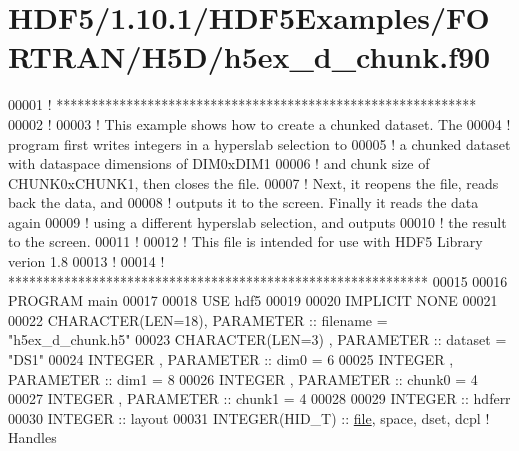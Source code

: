 \hypertarget{_h_d_f5_21_810_81_2_h_d_f5_examples_2_f_o_r_t_r_a_n_2_h5_d_2h5ex__d__chunk_8f90_source}{}\section{H\+D\+F5/1.10.1/\+H\+D\+F5\+Examples/\+F\+O\+R\+T\+R\+A\+N/\+H5\+D/h5ex\+\_\+d\+\_\+chunk.f90}
\label{_h_d_f5_21_810_81_2_h_d_f5_examples_2_f_o_r_t_r_a_n_2_h5_d_2h5ex__d__chunk_8f90_source}

\begin{DoxyCode}
00001 \textcolor{comment}{! ************************************************************}
00002 \textcolor{comment}{!}
00003 \textcolor{comment}{!  This example shows how to create a chunked dataset.  The}
00004 \textcolor{comment}{!  program first writes integers in a hyperslab selection to}
00005 \textcolor{comment}{!  a chunked dataset with dataspace dimensions of DIM0xDIM1}
00006 \textcolor{comment}{!  and chunk size of CHUNK0xCHUNK1, then closes the file.}
00007 \textcolor{comment}{!  Next, it reopens the file, reads back the data, and}
00008 \textcolor{comment}{!  outputs it to the screen.  Finally it reads the data again}
00009 \textcolor{comment}{!  using a different hyperslab selection, and outputs}
00010 \textcolor{comment}{!  the result to the screen.}
00011 \textcolor{comment}{!}
00012 \textcolor{comment}{!  This file is intended for use with HDF5 Library verion 1.8}
00013 \textcolor{comment}{!}
00014 \textcolor{comment}{! ************************************************************}
00015 
00016 \textcolor{keyword}{PROGRAM} main
00017 
00018   \textcolor{keywordtype}{USE }hdf5
00019 
00020   \textcolor{keywordtype}{IMPLICIT NONE}
00021 
00022   \textcolor{keywordtype}{CHARACTER(LEN=18)}, \textcolor{keywordtype}{PARAMETER} :: filename = \textcolor{stringliteral}{"h5ex\_d\_chunk.h5"}
00023   \textcolor{keywordtype}{CHARACTER(LEN=3)} , \textcolor{keywordtype}{PARAMETER} :: dataset  = \textcolor{stringliteral}{"DS1"}
00024   \textcolor{keywordtype}{INTEGER}          , \textcolor{keywordtype}{PARAMETER} :: dim0     = 6
00025   \textcolor{keywordtype}{INTEGER}          , \textcolor{keywordtype}{PARAMETER} :: dim1     = 8
00026   \textcolor{keywordtype}{INTEGER}          , \textcolor{keywordtype}{PARAMETER} :: chunk0   = 4
00027   \textcolor{keywordtype}{INTEGER}          , \textcolor{keywordtype}{PARAMETER} :: chunk1   = 4
00028 
00029   \textcolor{keywordtype}{INTEGER} :: hdferr
00030   \textcolor{keywordtype}{INTEGER} :: layout
00031   \textcolor{keywordtype}{INTEGER(HID\_T)}  :: \hyperlink{structfile}{file}, space, dset, dcpl \textcolor{comment}{! Handles}

\end{DoxyCode}
